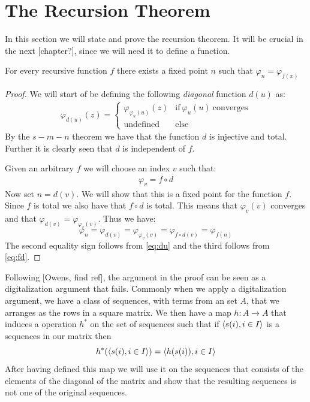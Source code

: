 \documentclass[../main.tex]{subfiles}
\begin{document}
\section{The Recursion Theorem}
In this section we will state and prove the recursion theorem. It will be
crucial in the next [chapter?], since we will need it to define a function.
\begin{thm}
	For every recursive function $f$ there exists a fixed point $n$ such
	that $\varphi_n=\varphi_{f(x)}$
\end{thm}
\begin{proof}
	We will start of be defining the following \textit{diagonal} function
	$d(u)$ as:
	\begin{align}
		\label{eq:du}
		\varphi_{d(u)}(z)=\begin{cases}
		\varphi_{\varphi_u(u)}(z)& \text{if}\ \varphi_u(u)\
		\text{converges}\\
		\text{undefined} & \text{else}
	\end{cases}
	\end{align}
	By the $s-m-n$ theorem we have that the function $d$ is injective and
	total. Further it is clearly seen that $d$ is independent of $f$.

	Given an arbitrary $f$ we will choose an index $v$ such that:
	\begin{align}
		\label{eq:fd}
		\varphi_v=f\circ d
	\end{align}
	Now set $n=d(v)$. We will show that this is a fixed point for the
	function $f$. Since $f$ is total we also have that $f\circ d$ is total.
	This means that $\varphi_v(v)$ converges and that
	$\varphi_{d(v)}=\varphi_{\varphi_v(v)}$. Thus we have:
	$$\varphi_n=\varphi_{d(v)}=\varphi_{\varphi_v(v)}=\varphi_{f\circ
	d(v)}=\varphi_{f(n)}$$
	The second equality sign follows from \ref{eq:du} and the third follows
	from \ref{eq:fd}.
\end{proof}
Following [Owens, find ref], the argument in the proof can be seen as a
digitalization argument that fails. Commonly when we apply a digitalization
argument, we have a class of sequences, with terms from an set $A$, that we arranges as the rows in a square
matrix. We then have a map $h:A\rightarrow A$ that induces a operation $h^*$ on
the set of sequences such that if $\langle s(i),i\in I\rangle$ is a sequences in our
matrix then 
$$h^*(\langle s(i),i\in I\rangle)=\langle h(s(i)),i\in I\rangle$$
After having defined this map we will use it on the sequences that consists of
the elements of the  diagonal of the matrix and
show that the resulting sequences is not one of the original sequences. 
\end{document}
